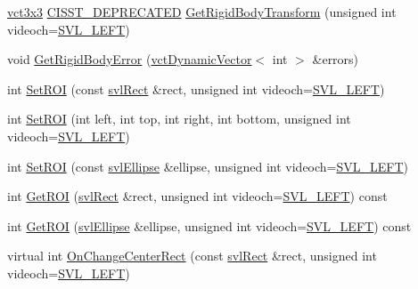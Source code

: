 \begin{DoxyCompactItemize}
\item 
\hyperlink{vct_fixed_size_matrix_types_8h_aac4a419dacf9282410675d42ebc86a7c}{vct3x3} \hyperlink{cmn_portability_8h_a63da7164735f9501be651b1f2bbc0121}{C\-I\-S\-S\-T\-\_\-\-D\-E\-P\-R\-E\-C\-A\-T\-E\-D} \hyperlink{classsvl_filter_image_tracker_a514560e58532ada9df7e5fb5ce4ccd5c}{Get\-Rigid\-Body\-Transform} (unsigned int videoch=\hyperlink{svl_definitions_8h_ab9fec7615f19c8df2919eebcab0b187f}{S\-V\-L\-\_\-\-L\-E\-F\-T})
\item 
void \hyperlink{classsvl_filter_image_tracker_a6861cd92affa6c1d507f11bf955eb60d}{Get\-Rigid\-Body\-Error} (\hyperlink{classvct_dynamic_vector}{vct\-Dynamic\-Vector}$<$ int $>$ \&errors)
\item 
int \hyperlink{classsvl_filter_image_tracker_a846f66ab216401cbe51dd7d74e30cf63}{Set\-R\-O\-I} (const \hyperlink{structsvl_rect}{svl\-Rect} \&rect, unsigned int videoch=\hyperlink{svl_definitions_8h_ab9fec7615f19c8df2919eebcab0b187f}{S\-V\-L\-\_\-\-L\-E\-F\-T})
\item 
int \hyperlink{classsvl_filter_image_tracker_aa190c53f01cfa940a53aacfa3baa1dc3}{Set\-R\-O\-I} (int left, int top, int right, int bottom, unsigned int videoch=\hyperlink{svl_definitions_8h_ab9fec7615f19c8df2919eebcab0b187f}{S\-V\-L\-\_\-\-L\-E\-F\-T})
\item 
int \hyperlink{classsvl_filter_image_tracker_a0e15c1e808d158bf5549aca8dfe394dc}{Set\-R\-O\-I} (const \hyperlink{structsvl_ellipse}{svl\-Ellipse} \&ellipse, unsigned int videoch=\hyperlink{svl_definitions_8h_ab9fec7615f19c8df2919eebcab0b187f}{S\-V\-L\-\_\-\-L\-E\-F\-T})
\item 
int \hyperlink{classsvl_filter_image_tracker_ab255a660860a32ba48e15ccf86524be4}{Get\-R\-O\-I} (\hyperlink{structsvl_rect}{svl\-Rect} \&rect, unsigned int videoch=\hyperlink{svl_definitions_8h_ab9fec7615f19c8df2919eebcab0b187f}{S\-V\-L\-\_\-\-L\-E\-F\-T}) const 
\item 
int \hyperlink{classsvl_filter_image_tracker_ad882be9b3eed81397c5946d4dbb42730}{Get\-R\-O\-I} (\hyperlink{structsvl_ellipse}{svl\-Ellipse} \&ellipse, unsigned int videoch=\hyperlink{svl_definitions_8h_ab9fec7615f19c8df2919eebcab0b187f}{S\-V\-L\-\_\-\-L\-E\-F\-T}) const 
\item 
virtual int \hyperlink{classsvl_filter_image_tracker_a4a62f05474d8fc1d769e1dd58b592c17}{On\-Change\-Center\-Rect} (const \hyperlink{structsvl_rect}{svl\-Rect} \&rect, unsigned int videoch=\hyperlink{svl_definitions_8h_ab9fec7615f19c8df2919eebcab0b187f}{S\-V\-L\-\_\-\-L\-E\-F\-T})
\item 

\end{DoxyCompactItemize}

